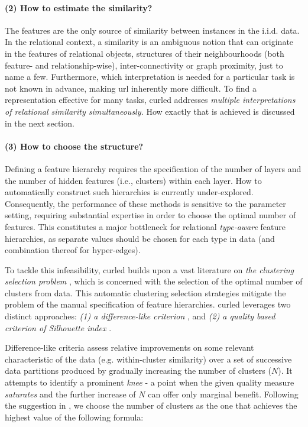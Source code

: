 \paragraph{(2) How to estimate the similarity?}
The features are the only source of similarity between instances in the i.i.d. data.
In the relational context, a similarity is an ambiguous notion that can originate in the  features of relational objects, structures of their neighbourhoods (both feature- and relationship-wise), inter-connectivity or graph proximity, just to name a few.
Furthermore, which interpretation is needed for a particular task is not known in advance, making \gls{url} inherently more difficult.
To find a representation effective for many tasks, \gls{curled} addresses \textit{multiple interpretations of relational similarity simultaneously.}
How exactly that is achieved is discussed in the next section.



\paragraph{(3) How to choose the structure?}
Defining a feature hierarchy requires the specification of the number of layers and the number of hidden features (i.e., clusters) within each layer.
How to automatically construct such hierarchies is currently under-explored.
Consequently, the performance of these methods is sensitive to the parameter setting, requiring substantial expertise in order to choose the optimal number of features.
This constitutes a major bottleneck for relational \textit{type-aware} feature hierarchies, as separate values should be chosen for each type in data (and combination thereof for hyper-edges).

To tackle this infeasibility, \gls{curled} builds upon a vast literature on \textit{the clustering selection problem} \cite{Arbelaitz:2013}, which is concerned with the selection of the optimal number of clusters from data.
This automatic clustering selection strategies mitigate the problem of the manual specification of feature hierarchies.
\gls{curled} leverages  two distinct approaches: \textit{(1) a difference-like criterion} \cite{Vendramin:2010}, and \textit{(2) a quality based criterion of Silhouette index} \cite{Rousseeuw:1987}.


Difference-like criteria assess relative improvements on some relevant characteristic of the data (e.g. within-cluster similarity) over a set of successive data partitions produced by gradually increasing the number of clusters ($N$).
It attempts to identify a prominent \textit{knee} - a point when the given quality measure \textit{saturates} and the further increase of $N$ can offer only marginal benefit.
Following the suggestion in \cite{Vendramin:2010}, we choose the number of clusters as the one that achieves the highest value of the following formula:

